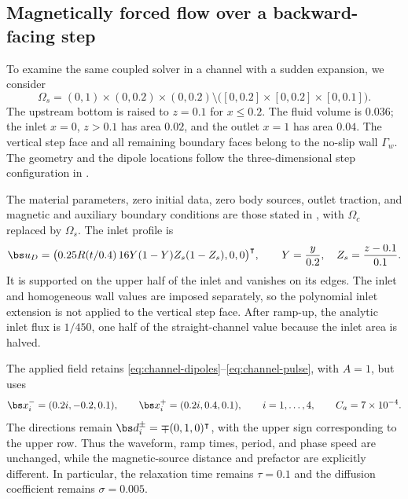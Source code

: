\subsection{Magnetically forced flow over a backward-facing step}
\label{subsec:backward-facing-step}
To examine the same coupled solver in a channel with a sudden
expansion, we consider
\begin{equation}\label{eq:step-domain}
 \Omega_s=(0,1)\times(0,0.2)\times(0,0.2)
 \setminus\bigl([0,0.2]\times[0,0.2]\times[0,0.1]\bigr).
\end{equation}
The upstream bottom is raised to $z=0.1$ for $x\leq0.2$.
The fluid volume is $0.036$; the inlet $x=0$, $z>0.1$ has area
$0.02$, and the outlet $x=1$ has area $0.04$.
The vertical step face and all remaining boundary faces belong
to the no-slip wall $\Gamma_w$.
The geometry and the dipole locations follow the three-dimensional
step configuration in \cite{DongHuangHuangYang2026}.

The material parameters, zero initial data, zero body sources,
outlet traction, and magnetic and auxiliary boundary conditions are
those stated in , with $\Omega_c$
replaced by $\Omega_s$. The inlet profile is
\begin{equation}\label{eq:step-inlet}
 \bs u_D=\bigl(0.25R(t/0.4)\,16Y(1-Y)Z_s(1-Z_s),0,0\bigr)^{\intercal},
 \qquad Y=\frac{y}{0.2},\quad Z_s=\frac{z-0.1}{0.1}.
\end{equation}
It is supported on the upper half of the inlet and vanishes on
its edges. The inlet and homogeneous wall values are imposed
separately, so the polynomial inlet extension is not applied to the
vertical step face. After ramp-up, the analytic inlet flux is
$1/450$, one half of the straight-channel value because the inlet
area is halved.

The applied field retains \eqref{eq:channel-dipoles}--\eqref{eq:channel-pulse},
with $A=1$, but uses
\begin{equation}\label{eq:step-dipoles}
 \bs x_i^-=(0.2i,-0.2,0.1),\qquad
 \bs x_i^+=(0.2i,0.4,0.1),\qquad i=1,\ldots,4,
 \qquad C_a=7\times10^{-4}.
\end{equation}
The directions remain $\bs d_i^{\pm}=\mp(0,1,0)^{\intercal}$,
with the upper sign corresponding to the upper row.
Thus the waveform, ramp times, period, and phase speed are unchanged,
while the magnetic-source distance and prefactor are explicitly
different. In particular, the relaxation time remains $\tau=0.1$
and the diffusion coefficient remains $\sigma=0.005$.

